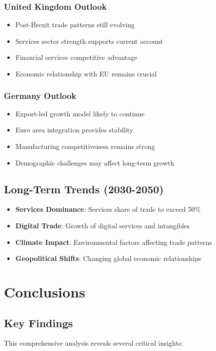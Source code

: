 \documentclass[11pt,a4paper]{article}
\begin{document}
\subsubsection{United Kingdom Outlook}
\begin{itemize}
    \item Post-Brexit trade patterns still evolving
    \item Services sector strength supports current account
    \item Financial services competitive advantage
    \item Economic relationship with EU remains crucial
\end{itemize}

\subsubsection{Germany Outlook}
\begin{itemize}
    \item Export-led growth model likely to continue
    \item Euro area integration provides stability
    \item Manufacturing competitiveness remains strong
    \item Demographic challenges may affect long-term growth
\end{itemize}

\subsection{Long-Term Trends (2030-2050)}
\begin{itemize}
    \item \textbf{Services Dominance}: Services share of trade to exceed 50\%
    \item \textbf{Digital Trade}: Growth of digital services and intangibles
    \item \textbf{Climate Impact}: Environmental factors affecting trade patterns
    \item \textbf{Geopolitical Shifts}: Changing global economic relationships
\end{itemize}

\section{Conclusions}

\subsection{Key Findings}
This comprehensive analysis reveals several critical insights:
\end{document}
